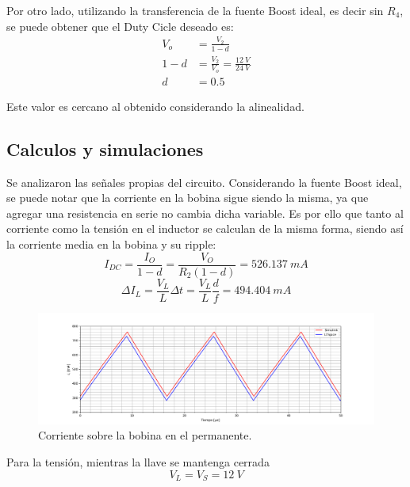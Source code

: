 Por otro lado, utilizando la transferencia de la fuente Boost ideal, es decir sin $R_4$, se puede obtener que el Duty Cicle deseado es:
\begin{align*}
V_o &= \frac{V_2}{1 - d}	\\
1 - d &= \frac{V_2}{V_o} = \frac{12 \ V}{24 \ V} \\
d &= 0.5
\end{align*}

Este valor es cercano al obtenido considerando la alinealidad.


\subsection{Calculos y simulaciones}

Se analizaron las señales propias del circuito. Considerando la fuente Boost ideal, se puede notar que la corriente en la bobina sigue siendo la misma, ya que agregar una resistencia en serie no cambia dicha variable. Es por ello que tanto al corriente como la tensión en el inductor se calculan de la misma forma, siendo así la corriente media en la bobina y su ripple:
\begin{equation*}
	I_{DC} = \frac{I_O}{1 - d} = \frac{V_O}{R_2 (1 - d)} = 526.137 \ mA
\end{equation*}
\begin{equation*}
	\Delta I_L = \frac{V_L}{L}\Delta t =  \frac{V_L}{L}  \frac{d}{f} = 494.404 \ mA  
\end{equation*}	%

\begin{figure}[H]
	\centering
	\includegraphics[width=\linewidth]{ImagenesEjercicio-2/il.png}
	\caption{Corriente sobre la bobina en el permanente.}
	\label{fig:ej2:il}
\end{figure}

Para la tensión, mientras la llave se mantenga cerrada
\begin{equation*}
	V_L = V_S = 12 \ V
\end{equation*}

